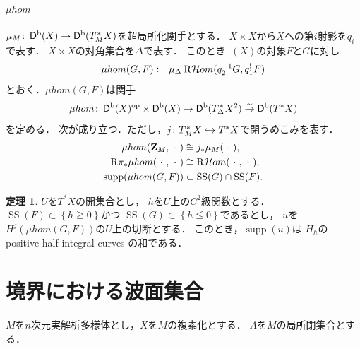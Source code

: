 \documentclass[leqno, 10pt, a4paper, dvipdfmx]{jsarticle}
\theoremstyle{definition}
\newcommand{\zz}{\mathbf{Z}}
\newcommand{\op}{{\rm op}} %
\numberwithin{equation}{section}
\newcommand{\supp}{\mathop{\mathrm{supp}}\nolimits}
\newcommand{\Dompb}{\mathop{\mathsf{D}^\mathrm{b}}\nolimits}
\newcommand{\HOM}{\mathop{\mathcal{H}\hspace{-0pt}om}\nolimits}%
\newcommand{\RHOM}{\mathop{\mathrm{R}\hspace{-1.5pt}\HOM}\nolimits}
\newcommand{\muS}{\mathop{\mathrm{SS}}\nolimits}
\newcommand{\Rder}{\mathrm{R}}
\newcommand{\simar}{\mathrel{\overset{\sim}{\rightarrow}}}%
\newcommand{\blk}{\mathord{\ \cdot\ }}
\theoremstyle{mystyle}
\newtheorem{THM}[AXM]{定理}
\newcommand{\cotb}[1][]{T^{\ast}{#1}}
\newcommand{\conm}[2][]{T_{#1}^{\hspace{0.7pt}\ast}{#2}}
\newcommand{\muhom}{\mu hom}
\newcommand{\diag}[1][]{\Delta_{#1}}
\newcommand{\micro}[1]{\mu_{#1}\hspace{0pt}}
\begin{document}
\paragraph{ \(\muhom\) }
\(\micro{M}\colon\Dompb(X)\to\Dompb(\conm[M]{X})\)を超局所化関手とする．
\(X\times X\)から\(X\)への第\(i\)射影を\(q_i\)で表す．
\(X\times X\)の対角集合を\(\diag[]\)で表す．
このとき\(\Dompb(X)\)の対象\(F\)と\(G\)に対し
\begin{equation}\label{eq:def-muhom}
    \muhom(G,F)\coloneqq
    \micro{\diag[]}\RHOM(q_{2}^{-1}G,q_{1}^{!}F)    
\end{equation}
とおく．\(\muhom(G,F)\)は関手\[
    \muhom\colon 
    \Dompb(X)^{\op}\times \Dompb(X)
    \to 
    \Dompb(\conm[{\diag[]}]{X^2})
    \simar
    \Dompb(\cotb[X])
\]
を定める．
次が成り立つ．ただし，\(j\colon \conm[M]{X}\hookrightarrow \cotb[X]\)で閉うめこみを表す．
\begin{align}
    \muhom(\zz_M,\blk)&\cong j_{\ast}\micro{M}(\blk),\label{eq:muhom-vs-micro}\\
    \Rder{\pi_{\ast}}\muhom(\blk,\blk)&\cong\RHOM(\blk,\blk),\label{eq:muhom-to-hom}\\
    \supp(\muhom(G,F))&\subset\muS(G)\cap\muS(F).\label{eq:supp-muhom}
\end{align}

\begin{THM}
    \(U\)を\(\cotb[X]\)の開集合とし，
    \(h\)を\(U\)上の\(C^2\)級関数とする．
    \(\muS(F)\subset\left\{h\geqq0\right\}\)かつ
    \(\muS(G)\subset\left\{h\leqq0\right\}\)であるとし，
    \(u\)を\(H^{j}(\muhom(G,F))\)の\(U\)上の切断とする．
    このとき，\(\supp(u)\)は
    \(H_h\)の positive half-integral curves の和である．
\end{THM}

\section{境界における波面集合}
\(M\)を\(n\)次元実解析多様体とし，\(X\)を\(M\)の複素化とする．
\(A\)を\(M\)の局所閉集合とする．
\end{document}
